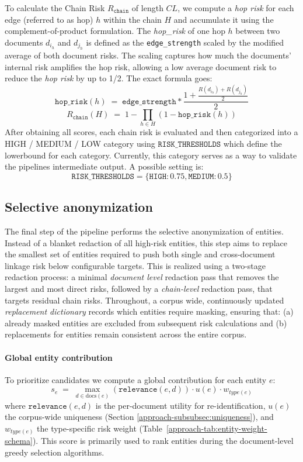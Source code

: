 To calculate the Chain Risk $R_{\texttt{chain}}$ of length $CL$, we compute a \emph{hop risk} for each edge (referred to as hop) $h$ within the chain $H$ and accumulate it using the complement-of-product formulation. The \textit{hop\_risk} of one hop $h$ between two documents $d_{i_h}$ and $d_{j_h}$ is defined as the \texttt{edge\_strength} scaled by the modified average of both document risks. The scaling captures how much the documents' internal risk amplifies the hop risk, allowing a low average document risk to reduce the \emph{hop risk} by up to 1/2. The exact formula goes:
\[
    \texttt{hop\_risk}(h)\;=\; \texttt{edge\_strength} * \frac{1+\frac{R(d_{i_h}) + R(d_{j_h})}{2}}{2}
\]
\[
    R_{\texttt{chain}}(H) \;=\; 1 - \prod_{h\in H} (1 - \texttt{hop\_risk}(h))
\]
After obtaining all scores, each chain risk is evaluated and then categorized into a HIGH / MEDIUM / LOW category using $\texttt{RISK\_THRESHOLDS}$ which define the lowerbound for each category. Currently, this category serves as a way to validate the pipelines intermediate output. A possible setting is:
\[
    \texttt{RISK\_THRESHOLDS} = \{\texttt{HIGH}: 0.75, \texttt{MEDIUM}: 0.5\}
\]

\subsection{Selective anonymization}
The final step of the pipeline performs the selective anonymization of entities. Instead of a blanket redaction of all high-risk entities, this step aims to replace the smallest set of entities required to push both single and cross-document linkage risk below configurable targets. This is realized using a two-stage redaction process: a minimal \textit{document level} redaction pass that removes the largest and most direct risks, followed by a \textit{chain-level} redaction pass, that targets residual chain risks. Throughout, a corpus wide, continuously updated \textit{replacement dictionary} records which entities require masking, ensuring that: (a) already masked entities are excluded from subsequent risk calculations and (b) replacements for entities remain consistent across the entire corpus.


\paragraph{Global entity contribution}
To prioritize candidates we compute a global contribution for each entity \(e\):
\[
    s_e \;=\; \max_{d\in\mathrm{docs}(e)} (\texttt{relevance}(e,d)) \cdot u(e) \cdot w_{type(e)}
\]
where $\texttt{relevance}(e,d)$ is the per-document utility for re-identification, $u(e)$ the corpus-wide uniqueness (Section \ref{approach-subsubsec:uniqueness}), and $w_{type(e)}$ the type-specific risk weight (Table~\ref{approach-tab:entity-weight-schema}). This score is primarily used to rank entities during the document-level greedy selection algorithms.

